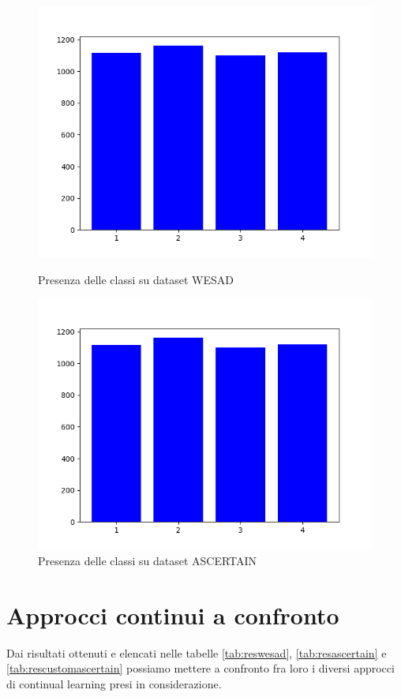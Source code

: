 \begin{figure}[h]
    \begin{minipage}[b]{0.5\textwidth}
		\includegraphics[width=\textwidth]{img/graphs/wesad_dataset.png}
		\caption{Presenza delle classi su dataset WESAD}
		\label{fig:wesadclasses}
	\end{minipage}
    \hfill
    \begin{minipage}[b]{0.5\textwidth}
		\includegraphics[width=\textwidth]{img/graphs/wesad_dataset.png}  %
		\caption{Presenza delle classi su dataset ASCERTAIN}
		\label{fig:ascertainclasses}
	\end{minipage}
\end{figure}

\section{Approcci continui a confronto}
Dai risultati ottenuti e elencati nelle tabelle \ref{tab:reswesad}, \ref{tab:resascertain} e \ref{tab:rescustomascertain} possiamo mettere a confronto fra loro i diversi approcci di continual learning presi in considerazione.